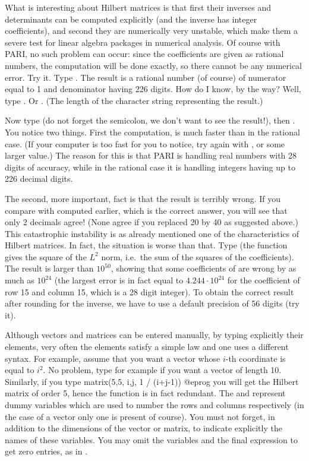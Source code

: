 What is interesting about Hilbert matrices is that first their inverses and
determinants can be computed explicitly (and the inverse has integer
coefficients), and second they are numerically very unstable, which make them
a severe test for linear algebra packages in numerical analysis.  Of course
with PARI, no such problem can occur: since the coefficients are given as
rational numbers, the computation will be done exactly, so there cannot be
any numerical error. Try it. Type . The result is a
rational number (of course) of numerator equal to 1 and denominator having
226 digits. How do I know, by the way? Well, type . Or
. (The length of the character string representing the
result.)

Now type  (do not forget the semicolon, we don't want to see
the result!), then . You notice two things. First the
computation, is much faster than in the rational case. (If your computer is
too fast for you to notice, try again with , or
some larger value.) The reason for this is that PARI is handling real
numbers with 28 digits of accuracy, while in the rational case it is
handling integers having up to 226 decimal digits.

The second, more important, fact is that the result is terribly wrong. If you
compare with  computed earlier, which is the correct answer, you
will see that only 2 decimals agree! (None agree if you replaced 20 by 40 as
suggested above.) This catastrophic instability is as already mentioned one
of the characteristics of Hilbert matrices. In fact, the situation is
worse than that. Type  (the function 
gives the square of the $L^2$ norm, i.e.~the sum of the squares of the
coefficients). The result is larger than $10^{50}$, showing that some
coefficients of  are wrong by as much as $10^{24}$ (the largest
error is in fact equal to $4.244 \cdot 10^{24}$ for the coefficient of row 15
and column 15, which is a 28 digit integer). To obtain the correct result
after rounding for the inverse, we have to use a default precision of 56
digits (try it).

Although vectors and matrices can be entered manually, by typing explicitly
their elements, very often the elements satisfy a simple law and one uses a
different syntax. For example, assume that you want a vector whose $i$-th
coordinate is equal to $i^2$. No problem, type for example
 if you want a vector of length 10. Similarly, if
you type
\bprog
  matrix(5,5, i,j, 1 / (i+j-1))
@eprog\noindent
you will get the Hilbert matrix of order 5, hence the 
function is in fact redundant.  The  and  represent dummy
variables which are used to number the rows and columns respectively (in
the case of a vector only one is present of course). You must not forget,
in addition to the dimensions of the vector or matrix, to indicate
explicitly the names of these variables. You may omit the variables and
the final expression to get zero entries, as in .

